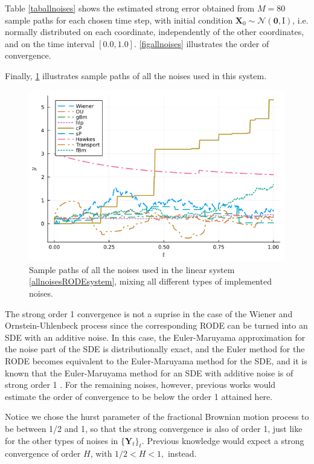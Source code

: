 \documentclass[reqno,12pt]{amsart}
\theoremstyle{plain} %
\theoremstyle{definition} %
\begin{document}
Table \ref{taballnoises} shows the estimated strong error obtained from $M = 80$ sample paths for each chosen time step, with initial condition $\mathbf{X}_0 \sim \mathcal{N}(\mathbf{0}, \mathrm{I})$, i.e. normally distributed on each coordinate, independently of the other coordinates, and on the time interval $[0.0, 1.0]$. \cref{figallnoises} illustrates the order of convergence.

Finally, \cref{figsamplepathsallnoises} illustrates sample paths of all the noises used in this system.

\begin{figure}[htb]
    \includegraphics[scale=0.6]{img/noisepath_allnoises.png}
    \caption{Sample paths of all the noises used in the linear system \eqref{allnoisesRODEsystem}, mixing all different types of implemented noises.}
    \label{figsamplepathsallnoises}
\end{figure}

The strong order 1 convergence is not a suprise in the case of the Wiener and Ornstein-Uhlenbeck process since the corresponding RODE can be turned into an SDE with an additive noise. In this case, the Euler-Maruyama approximation for the noise part of the SDE is distributionally exact, and the Euler method for the RODE becomes equivalent to the Euler-Maruyama method for the SDE, and it is known that the Euler-Maruyama method for an SDE with additive noise is of strong order 1 \cite{HighamKloeden2021}. For the remaining noises, however, previous works would estimate the order of convergence to be below the order 1 attained here.

Notice we chose the hurst parameter of the fractional Brownian motion process to be between 1/2 and 1, so that the strong convergence is also of order 1, just like for the other types of noises in $\{\mathbf{Y}_t\}_t$. Previous knowledge would expect a strong convergence of order $H$, with $1/2 < H < 1,$ instead.
\end{document}
